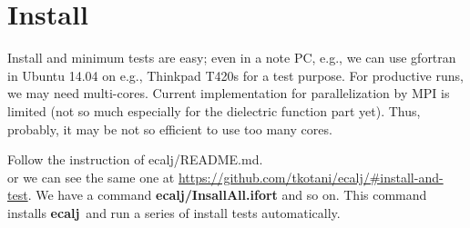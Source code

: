 \documentclass[a4paper,10pt,epsf,fleqn]{article}
\newcommand{\exe}[1]{{\bf #1}}
\newcommand{\io}[1]{{\sf  #1}}
\newcommand{\ecalj}{{\bf ecalj}\ }
\begin{document}
\newpage
\section{Install}
\label{install}
Install and minimum tests are easy; even in a note PC, e.g.,
we can use gfortran in Ubuntu 14.04 on e.g., Thinkpad T420s for a test purpose.
For productive runs, we may need multi-cores. 
Current implementation for parallelization by MPI is limited
(not so much especially for the dielectric function part yet). 
Thus, probably, it may be not so efficient to use too many cores.

Follow the instruction of \io{ecalj/README.md}.\\
or we can see the same one at \url{https://github.com/tkotani/ecalj/#install-and-test}.
We have a command \exe{ecalj/InsallAll.ifort} and so on.
This command installs \ecalj and run a series of install tests automatically.
\end{document}
